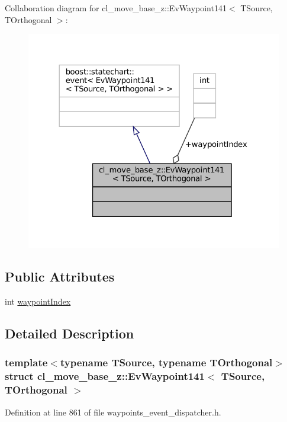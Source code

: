 Collaboration diagram for cl\+\_\+move\+\_\+base\+\_\+z\+:\+:Ev\+Waypoint141$<$ T\+Source, T\+Orthogonal $>$\+:
\nopagebreak
\begin{figure}[H]
\begin{center}
\leavevmode
\includegraphics[width=324pt]{structcl__move__base__z_1_1EvWaypoint141__coll__graph}
\end{center}
\end{figure}
\subsection*{Public Attributes}
\begin{DoxyCompactItemize}
\item 
int \hyperlink{structcl__move__base__z_1_1EvWaypoint141_acb2d1a69e6c0eb5defa0ac8224668eb9}{waypoint\+Index}
\end{DoxyCompactItemize}


\subsection{Detailed Description}
\subsubsection*{template$<$typename T\+Source, typename T\+Orthogonal$>$\newline
struct cl\+\_\+move\+\_\+base\+\_\+z\+::\+Ev\+Waypoint141$<$ T\+Source, T\+Orthogonal $>$}



Definition at line 861 of file waypoints\+\_\+event\+\_\+dispatcher.\+h.



